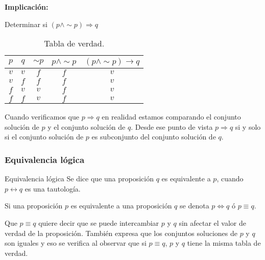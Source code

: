 \begin{ejemplo}{\bf Implicación:}

Determinar si $\left(p\wedge\sim p\right)\Rightarrow q$ \end{ejemplo}

\solu 
\begin{table}[H]
\centering

\caption{Tabla de verdad.}

\begin{tabular}{c|c|c|c|c}
\arrayrulecolor{ptctitle}\cellcolor{ptctitle!50}$p$ &
\cellcolor{ptctitle!50}$q$ &
\cellcolor{ptctitle!50}$\sim p$ &
\cellcolor{ptctitle!50}$p\wedge\sim p$ &
\cellcolor{ptctitle!50}$\left(p\wedge\sim p\right)\rightarrow q$\tabularnewline
\hline 
\cellcolor{ptcbackground} $v$ &
\cellcolor{ptcbackground}$v$ &
\cellcolor{ptcbackground}$f$ &
\cellcolor{ptcbackground}$f$ &
\cellcolor{ptcbackground}$v$\tabularnewline
\hline 
\cellcolor{gray!50}$v$ &
\cellcolor{gray!50} $f$ &
\cellcolor{gray!50}$f$ &
\cellcolor{gray!50}$f$ &
\cellcolor{gray!50}$v$\tabularnewline
\hline 
\cellcolor{ptcbackground}$f$ &
\cellcolor{ptcbackground} $v$ &
\cellcolor{ptcbackground} $v$ &
\cellcolor{ptcbackground}$f$ &
\cellcolor{ptcbackground}$v$\tabularnewline
\hline 
\cellcolor{gray!50} $f$ &
\cellcolor{gray!50} $f$ &
\cellcolor{gray!50} $v$ &
\cellcolor{gray!50}$f$ &
\cellcolor{gray!50}$v$\tabularnewline
\hline 
\end{tabular}
\end{table}

Cuando verificamos que $p\Rightarrow q$ en realidad estamos comparando
el conjunto solución de $p$ y el conjunto solución de $q.$ Desde
ese punto de vista $p\Rightarrow q$ si y solo si el conjunto solución
de $p$ es subconjunto del conjunto solución de $q.$

\subsubsection{Equivalencia lógica}

\begin{defi}{Equivalencia lógica}{} Se dice que una proposición
$q$ es equivalente a $p$, cuando $p\leftrightarrow q$ es una tautología.\end{defi}

\notacion  Si una proposición $p$ es equivalente a una proposición
$q$ se denota $p\Leftrightarrow q$ ó $p\equiv q.$

\obs Que $p\equiv q$ quiere decir que se puede intercambiar $p$
y $q$ sin afectar el valor de verdad de la proposición. También expresa
que los conjuntos soluciones de $p$ y $q$ son iguales y eso se verifica
al observar que si $p\equiv q$, $p$ y $q$ tiene la misma tabla
de verdad.

